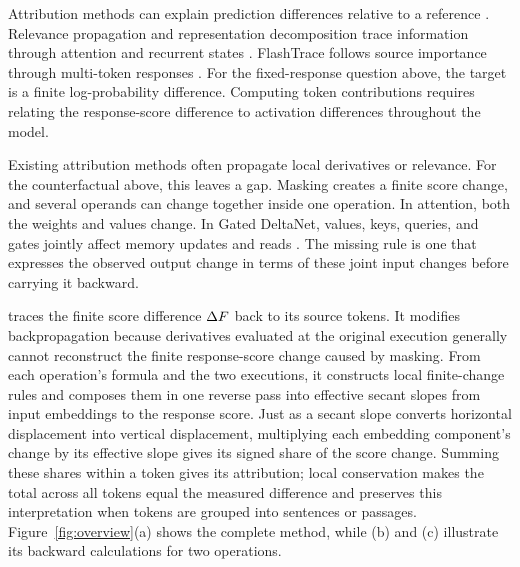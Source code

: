 Attribution methods can explain prediction differences relative to a reference \citep{sundararajan2017axiomatic,shrikumar2017deeplift}. Relevance propagation and representation decomposition trace information through attention and recurrent states \citep{ali2022conservative,achtibat2024attnlrp,jafari2024mambalrp,modarressi2023decompx,pitorro2025latim}. FlashTrace follows source importance through multi-token responses \citep{pan2026flashtrace}. For the fixed-response question above, the target is a finite log-probability difference. Computing token contributions requires relating the response-score difference to activation differences throughout the model.

Existing attribution methods often propagate local derivatives or relevance. For the counterfactual above, this leaves a gap. Masking creates a finite score change, and several operands can change together inside one operation. In attention, both the weights and values change. In Gated DeltaNet, values, keys, queries, and gates jointly affect memory updates and reads \citep{yang2024gated}. The missing rule is one that expresses the observed output change in terms of these joint input changes before carrying it backward.

\textbf{\dt{}} traces the finite score difference $\Delta F$ back to its source tokens. It modifies backpropagation because derivatives evaluated at the original execution generally cannot reconstruct the finite response-score change caused by masking. From each operation's formula and the two executions, it constructs local finite-change rules and composes them in one reverse pass into effective secant slopes from input embeddings to the response score. Just as a secant slope converts horizontal displacement into vertical displacement, multiplying each embedding component's change by its effective slope gives its signed share of the score change. Summing these shares within a token gives its attribution; local conservation makes the total across all tokens equal the measured difference and preserves this interpretation when tokens are grouped into sentences or passages. Figure~\ref{fig:overview}(a) shows the complete method, while (b) and (c) illustrate its backward calculations for two operations.

